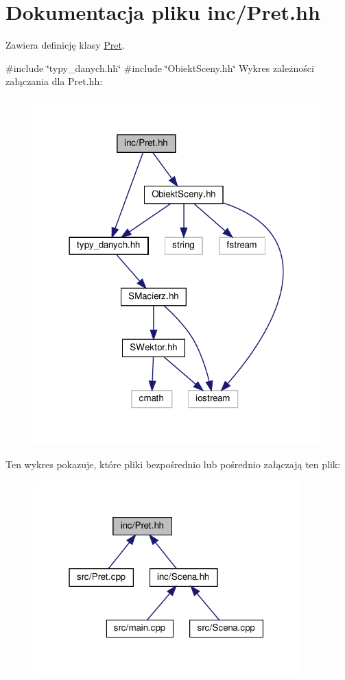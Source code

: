 \hypertarget{Pret_8hh}{}\section{Dokumentacja pliku inc/\+Pret.hh}
\label{Pret_8hh}


Zawiera definicję klasy \hyperlink{classPret}{Pret}.  


{\ttfamily \#include \char`\"{}typy\+\_\+danych.\+hh\char`\"{}}\newline
{\ttfamily \#include \char`\"{}Obiekt\+Sceny.\+hh\char`\"{}}\newline
Wykres zależności załączania dla Pret.\+hh\+:\nopagebreak
\begin{figure}[H]
\begin{center}
\leavevmode
\includegraphics[width=314pt]{Pret_8hh__incl}
\end{center}
\end{figure}
Ten wykres pokazuje, które pliki bezpośrednio lub pośrednio załączają ten plik\+:\nopagebreak
\begin{figure}[H]
\begin{center}
\leavevmode
\includegraphics[width=292pt]{Pret_8hh__dep__incl}
\end{center}
\end{figure}
